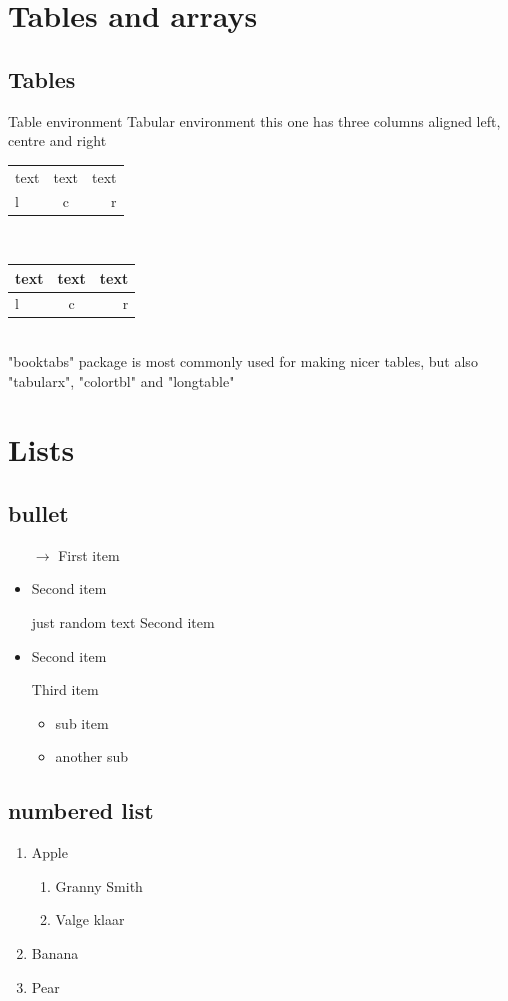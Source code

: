 \documentclass[16pt,a4paper]{article}
\begin{document}
\section{Tables and arrays}
\subsection{Tables}
Table environment Tabular environment
this one has three columns aligned left, centre and right\\
\begin{tabular}{lcr}
    text    & text  & text \\
    l   & c & r
\end{tabular}\\
\begin{tabular}{|||l|c|r|}
    \hline
    text    & text  & text \\
    \hline
    \hline
    l   & c & r \\
    \hline
\end{tabular}\\
    "booktabs" package is most commonly used for making nicer tables, but also "tabularx", "colortbl" and "longtable"

\section{Lists}
\subsection{bullet}
\begin{itemize}
    \item [$\rightarrow$] First item
    \item Second item
    \item [just random text] Second item
    \item Second item
    \item [] Third item
    \begin{itemize}
        \item sub item
        \item another sub
    \end{itemize}
\end{itemize}
\subsection{numbered list}
\begin{enumerate}
    \item Apple 
    \begin{enumerate}
        \item Granny Smith
        \item Valge klaar
    \end{enumerate}
    \item Banana
    \item Pear 
\end{enumerate}
\end{document}
